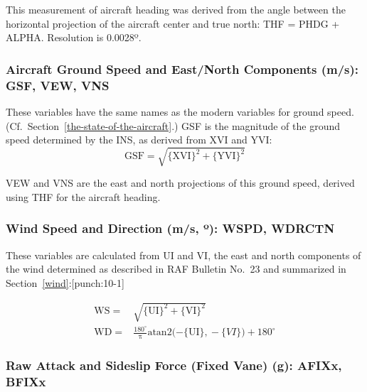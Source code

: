 \documentclass[
  english,
]{book}
\begin{document}
This measurement of aircraft heading was derived from the angle between the horizontal projection of the aircraft center and true north: THF = PHDG + ALPHA. Resolution is 0.0028{º}.

\hypertarget{gsf-obsolete}{%
\subsubsection*{Aircraft Ground Speed and East/North Components (m/s): GSF, VEW, VNS}\label{gsf-obsolete}}

These variables have the same names as the modern variables for ground speed. (Cf.~Section~\ref{the-state-of-the-aircraft}.) GSF is the magnitude of the ground speed determined by the INS, as derived from XVI and YVI:\\

\begin{equation}
\mathrm{GSF=\sqrt{\{XVI\}^{2}+\{YVI\}^{2}}}
\label{eq:GSF}
\end{equation}

VEW and VNS are the east and north projections of this ground speed, derived using THF for the aircraft heading.

\hypertarget{wspd}{%
\subsubsection*{\texorpdfstring{Wind Speed and Direction (m/s, {º}): WSPD, WDRCTN}{Wind Speed and Direction (m/s, º): WSPD, WDRCTN}}\label{wspd}}

These variables are calculated from UI and VI, the east and north components of the wind determined as described in RAF Bulletin No.~23 and summarized in Section~\ref{wind}:\protect\hypertarget{punch:10-1}{}{{[}punch:10-1{]}}

\begin{align}
\mathrm{WS} = & \sqrt{\mathrm{\{UI\}^{2}+\{VI\}^{2}}} \label{eq:WSobs}\\
\mathrm{WD} = & \mathrm{\frac{180^{\circ}}{\pi}atan2(-\{UI\},}-\{VI\})+180^{\circ}
\label{eq:WDobs}
\end{align}

\hypertarget{vanes}{%
\subsubsection*{Raw Attack and Sideslip Force (Fixed Vane) (g): AFIXx, BFIXx}\label{vanes}}
\end{document}
